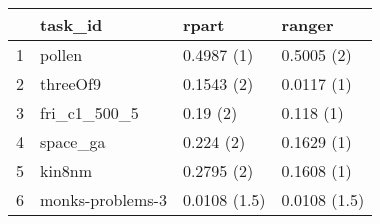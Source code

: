 \begin{table}[ht]
\centering
\begin{tabular}{rlll}
  \hline
 & task\_id & rpart & ranger \\ 
  \hline
1 & pollen & 0.4987 (1) & 0.5005 (2) \\ 
  2 & threeOf9 & 0.1543 (2) & 0.0117 (1) \\ 
  3 & fri\_c1\_500\_5 & 0.19 (2) & 0.118 (1) \\ 
  4 & space\_ga & 0.224 (2) & 0.1629 (1) \\ 
  5 & kin8nm & 0.2795 (2) & 0.1608 (1) \\ 
  6 & monks-problems-3 & 0.0108 (1.5) & 0.0108 (1.5) \\ 
   \hline
\end{tabular}
\end{table}
